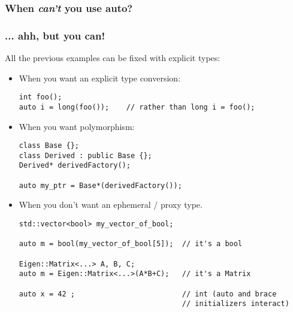 \begin{frame}[fragile]
\frametitle{When \emph{can't} you use auto?}
\frametitle{... ahh, but you can!}
All the previous examples can be fixed with explicit types:
\begin{itemize}
\item When you want an explicit type conversion:
{\scriptsize
\begin{verbatim}
int foo();
auto i = long(foo());    // rather than long i = foo();                            
\end{verbatim}
}
\vskip 6pt

\item When you want polymorphism:
{\scriptsize
\begin{verbatim}
class Base {};
class Derived : public Base {};
Derived* derivedFactory();

auto my_ptr = Base*(derivedFactory()); 

\end{verbatim} }
\vskip 6pt
\item When you don't want an ephemeral / proxy type.
{\scriptsize
\begin{verbatim}
std::vector<bool> my_vector_of_bool;

auto m = bool(my_vector_of_bool[5]);  // it's a bool

Eigen::Matrix<...> A, B, C;
auto m = Eigen::Matrix<...>(A*B+C);   // it's a Matrix

auto x = 42 ;                         // int (auto and brace
                                      // initializers interact)

\end{verbatim}
}
\vskip 6pt


\end{itemize} %
\end{frame}



